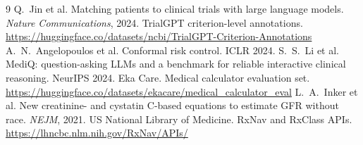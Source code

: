 \documentclass[10pt,a4paper,twocolumn]{article}
\begin{document}
{\footnotesize\raggedright
\begin{thebibliography}{9}\setlength{\itemsep}{0.3pt}
 Q.~Jin et al. Matching patients to clinical trials with large language models. \emph{Nature Communications}, 2024.
 TrialGPT criterion-level annotations. \url{https://huggingface.co/datasets/ncbi/TrialGPT-Criterion-Annotations}
 A.~N.~Angelopoulos et al. Conformal risk control. ICLR 2024.
 S.~S.~Li et al. MediQ: question-asking LLMs and a benchmark for reliable interactive clinical reasoning. NeurIPS 2024.
 Eka Care. Medical calculator evaluation set. \url{https://huggingface.co/datasets/ekacare/medical_calculator_eval}
 L.~A.~Inker et al. New creatinine- and cystatin C-based equations to estimate GFR without race. \emph{NEJM}, 2021.
 US National Library of Medicine. RxNav and RxClass APIs. \url{https://lhncbc.nlm.nih.gov/RxNav/APIs/}
\end{thebibliography}}
\end{document}
